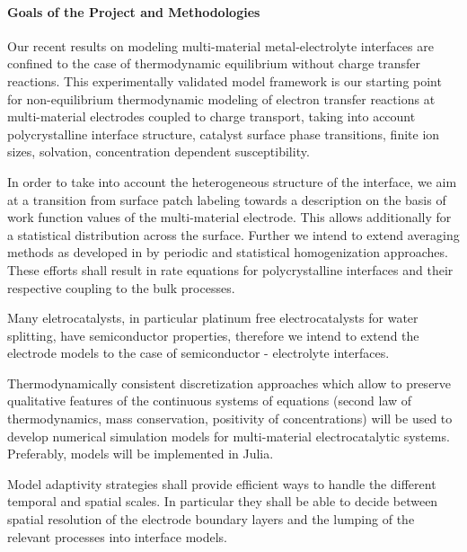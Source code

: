 \documentclass[a4paper,10pt]{article}
\begin{document}
\paragraph{Goals of the Project and Methodologies}
Our recent results on modeling multi-material metal-electrolyte interfaces are confined to the case of thermodynamic equilibrium without charge transfer reactions. This experimentally validated model framework is our starting point for non-equilibrium thermodynamic modeling of electron transfer reactions at multi-material electrodes coupled to charge transport, taking into account polycrystalline interface structure, catalyst surface phase transitions, finite ion sizes, solvation, concentration dependent susceptibility.

In order to take into account  the heterogeneous structure of the interface, we aim at a transition from surface patch labeling towards a description %
on the basis of work function values of the multi-material electrode. This allows additionally for a statistical distribution across the surface. Further we intend to extend averaging methods as developed in \cite{JES}  by periodic and statistical homogenization approaches.
%
These efforts shall result in  rate   equations  for polycrystalline interfaces  and their respective coupling to the bulk processes.

Many eletrocatalysts, in particular platinum free electrocatalysts for water splitting, have semiconductor properties, therefore we intend to extend the electrode models to the case of semiconductor - electrolyte interfaces.

Thermodynamically consistent discretization approaches which allow to preserve qualitative features of the continuous systems of equations  (second law of thermodynamics, mass conservation, positivity of concentrations) will be used to  develop numerical simulation models for multi-material electrocatalytic systems.  Preferably, models will be implemented in  Julia.

Model adaptivity strategies shall provide efficient ways to handle the different temporal and spatial scales. %
In particular they shall be able to decide between spatial resolution of the electrode boundary layers and the lumping of the relevant processes into interface models.
\end{document}
